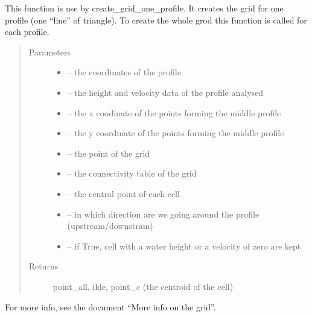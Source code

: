 \documentclass[letterpaper,10pt,english]{sphinxmanual}
\begin{document}

\begin{fulllineitems}
\label{\detokenize{index:src.manage_grid_8.get_new_point_and_cell_1_profil}}
This function is use by create\_grid\_one\_profile. It creates the grid for one profile (one ``line'' of triangle).
To create the whole grod this function is called for each profile.
\begin{quote}\begin{description}
\item[{Parameters}] \leavevmode\begin{itemize}
\item {} 
 -- the coordinates of the profile

\item {} 
 -- the height and velocity data of the profile analysed

\item {} 
 -- the x coodinate of the points forming the middle profile

\item {} 
 -- the y coordinate of the points forming the middle profile

\item {} 
 -- the point of the grid

\item {} 
 -- the connectivity table of the grid

\item {} 
 -- the central point of each cell

\item {} 
 -- in which direction are we going around the profile (upstream/downstram)

\item {} 
 -- if True, cell with a water height or a velocity of zero are kept

\end{itemize}

\item[{Returns}] \leavevmode
point\_all, ikle, point\_c (the centroid of the cell)

\end{description}\end{quote}

For more info, see the document ``More info on the grid''.

\end{fulllineitems}
\end{document}
